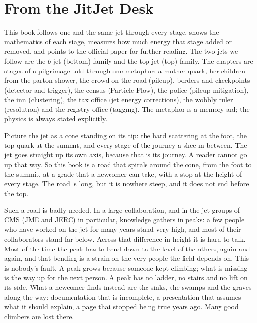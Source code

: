 

\section*{From the JitJet Desk}

This book follows one and the same jet through every stage, shows the
mathematics of each stage, measures how much energy that stage added or
removed, and points to the official paper for further reading. The two jets
we follow are the $b$-jet (bottom) family and the top-jet (top) family. The
chapters are stages of a pilgrimage told through one metaphor: a mother
quark, her children from the parton shower, the crowd on the road (pileup),
borders and checkpoints (detector and trigger), the census (Particle Flow),
the police (pileup mitigation), the inn (clustering), the tax office (jet
energy corrections), the wobbly ruler (resolution) and the registry office
(tagging). The metaphor is a memory aid; the physics is always stated
explicitly.

Picture the jet as a cone standing on its tip: the hard scattering at the
foot, the top quark at the summit, and every stage of the journey a slice in
between. The jet goes straight up its own axis, because that is its journey.
A reader cannot go up that way. So this book is a road that spirals around
the cone, from the foot to the summit, at a grade that a newcomer can take,
with a stop at the height of every stage. The road is long, but it is
nowhere steep, and it does not end before the top.

Such a road is badly needed. In a large collaboration, and in the jet
groups of CMS (JME and JERC) in particular, knowledge gathers in peaks: a
few people who have worked on the jet for many years stand very high, and
most of their collaborators stand far below. Across that difference in
height it is hard to talk. Most of the time the peak has to bend down to
the level of the others, again and again, and that bending is a strain on
the very people the field depends on. This is nobody's fault. A peak grows
because someone kept climbing; what is missing is the way up for the next
person. A peak has no ladder, no stairs and no lift on its side. What a
newcomer finds instead are the sinks, the swamps and the graves along the
way: documentation that is incomplete, a presentation that assumes what it
should explain, a page that stopped being true years ago. Many good
climbers are lost there.

